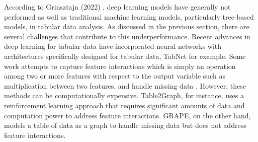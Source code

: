 %			
%	
According to Grinsztajn (2022) \cite{Grinsztajn}, deep learning models have generally not performed as well as traditional machine learning models, particularly tree-based models, in tabular data analysis.
As discussed in the previous section, there are several challenges that contribute to this underperformance.
Recent advances in deep learning for tabular data have incorporated neural networks with architectures specifically designed for tabular data, TabNet \cite{Tabnet} for example.
Some work attempts to capture feature interactions \cite{Table2Graph} which is simply an operation among two or more features with respect to the output variable such as multiplication between two features, and handle missing data \cite{GRAPE}. 
However, these methods can be computationally expensive.
Table2Graph, for instance, uses a reinforcement learning approach that requires significant amounts of data and computation power to address feature interactions. GRAPE, on the other hand, models a table of data as a graph to handle missing data but does not address feature interactions.

